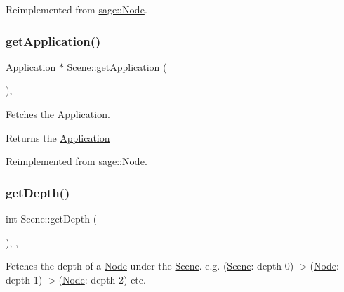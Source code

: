 Reimplemented from \mbox{\hyperlink{classsage_1_1Node_a1c8fbbf37b6e9cf6c7f5e0a4ae4a73cb}{sage\+::\+Node}}.

\mbox{\label{classsage_1_1Scene_a30ecf9ad001d30773982f0808b05867d}} 
\subsubsection{\texorpdfstring{getApplication()}{getApplication()}}
{\footnotesize\ttfamily \mbox{\hyperlink{classsage_1_1Application}{Application}} $\ast$ Scene\+::get\+Application (\begin{DoxyParamCaption}{ }\end{DoxyParamCaption})\hspace{0.3cm}{\ttfamily [override]}, {\ttfamily [virtual]}}



Fetches the \mbox{\hyperlink{classsage_1_1Application}{Application}}. 

\begin{DoxyReturn}{Returns}
the \mbox{\hyperlink{classsage_1_1Application}{Application}} 
\end{DoxyReturn}


Reimplemented from \mbox{\hyperlink{classsage_1_1Node_af0f8bb1150be77ccc56cf470f3058176}{sage\+::\+Node}}.

\mbox{\label{classsage_1_1Scene_a46335ecefda27ab0b907397a393a12f9}} 
\subsubsection{\texorpdfstring{getDepth()}{getDepth()}}
{\footnotesize\ttfamily int Scene\+::get\+Depth (\begin{DoxyParamCaption}{ }\end{DoxyParamCaption})\hspace{0.3cm}{\ttfamily [override]}, {\ttfamily [protected]}, {\ttfamily [virtual]}}



Fetches the depth of a \mbox{\hyperlink{classsage_1_1Node}{Node}} under the \mbox{\hyperlink{classsage_1_1Scene}{Scene}}. e.\+g. (\mbox{\hyperlink{classsage_1_1Scene}{Scene}}\+: depth 0)-\/$>$(\mbox{\hyperlink{classsage_1_1Node}{Node}}\+: depth 1)-\/$>$(\mbox{\hyperlink{classsage_1_1Node}{Node}}\+: depth 2) etc. 

